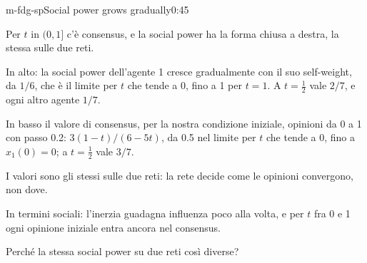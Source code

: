 \begin{slide}{m-fdg-sp}{Social power grows gradually}{0:45}
  \begin{discorso}
    \item Per $t$ in $(0,1]$ c'è consensus, e la social power ha la forma chiusa a destra, la stessa sulle due reti.
    \item In alto: la social power dell'agente 1 cresce gradualmente con il suo self-weight, da $1/6$, che è il limite per $t$ che tende a 0, fino a 1 per $t=1$. A $t=\tfrac12$ vale $2/7$, e ogni altro agente $1/7$.
    \item In basso il valore di consensus, per la nostra condizione iniziale, opinioni da 0 a 1 con passo 0.2: $3(1-t)/(6-5t)$, da 0.5 nel limite per $t$ che tende a 0, fino a $x_1(0)=0$; a $t=\tfrac12$ vale $3/7$.
    \item I valori sono gli stessi sulle due reti: la rete decide come le opinioni convergono, non dove.
    \item In termini sociali: l'inerzia guadagna influenza poco alla volta, e per $t$ fra 0 e 1 ogni opinione iniziale entra ancora nel consensus.
    \item Perché la stessa social power su due reti così diverse?
  \end{discorso}
\end{slide}

